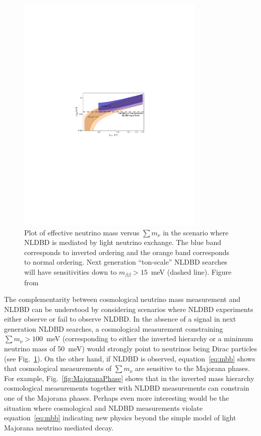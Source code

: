 \begin{figure}[h!]
\centering \includegraphics[width=0.8\textwidth]{Neutrinos/mbb_v_sum_m_nu.pdf}
\caption{Plot of effective neutrino mass versus $\sum m_\nu$ in the scenario where NLDBD is mediated by light neutrino exchange. The blue band corresponds to inverted ordering and the orange band corresponds to normal ordering. Next generation ``ton-scale'' NLDBD searches will have sensitivities down to $m_{\beta\beta}>15$~meV (dashed line). Figure from~\cite{Dell'Oro:2014yca}}
\label{fig:NLDBD}
\end{figure}

The complementarity between cosmological neutrino mass measurement and NLDBD can be understood by considering scenarios where NLDBD experiments either observe or fail to observe NLDBD. In the absence of a signal in next generation NLDBD searches, a cosmological measurement constraining $\sum m_\nu > 100$~meV (corresponding to either the inverted hierarchy or a minimum neutrino mass of 50~meV) would strongly point to neutrinos being Dirac particles (see Fig.~\ref{fig:NLDBD}). On the other hand, if NLDBD is observed, equation~\ref{eq:mbb} shows that cosmological measurements of $\sum m_\nu$ are sensitive to the Majorana phases. For example, Fig.~\ref{fig:MajoranaPhase} shows that in the inverted mass hierarchy cosmological measurements together with NLDBD measurements can constrain one of the Majorana phases. Perhaps even more interesting would be the situation where cosmological and NLDBD measurements violate equation~\ref{eq:mbb} indicating new physics beyond the simple model of light Majorana neutrino mediated decay.

